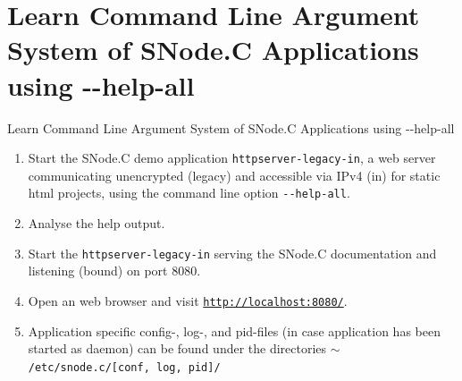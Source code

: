 \section{Learn Command Line Argument System of SNode.C Applications using -{}-help-all}

\begin{frame}{Learn Command Line Argument System of SNode.C Applications using -{}-help-all}
  \begin{enumerate}
    \item Start the SNode.C demo application \textcolor{fh-ooe-red}{\texttt{httpserver-legacy-in}}, a web server communicating unencrypted (\textcolor{fh-ooe-red}{legacy}) and accessible via IPv4 (\textcolor{fh-ooe-red}{in}) for static html projects, using the command line option \textcolor{fh-ooe-red}{\texttt{-{}-help-all}}.
    \item Analyse the help output.
    \item Start the \textcolor{fh-ooe-red}{\texttt{httpserver-legacy-in}} serving the SNode.C documentation and listening (bound) on \textcolor{fh-ooe-red}{port 8080}.
    \item Open an web browser and visit \texttt{\textcolor{fh-ooe-red}{\href{http://localhost:8080/}{http://localhost:8080/}}}.
    \item \textcolor{fh-ooe-red}{Application specific config-, log-, and pid-files} (in case application has been started as daemon) can be found under the directories \texttt{\textcolor{fh-ooe-red}{$\sim$/etc/snode.c/[conf, log, pid]/}}
  \end{enumerate}
\end{frame}
